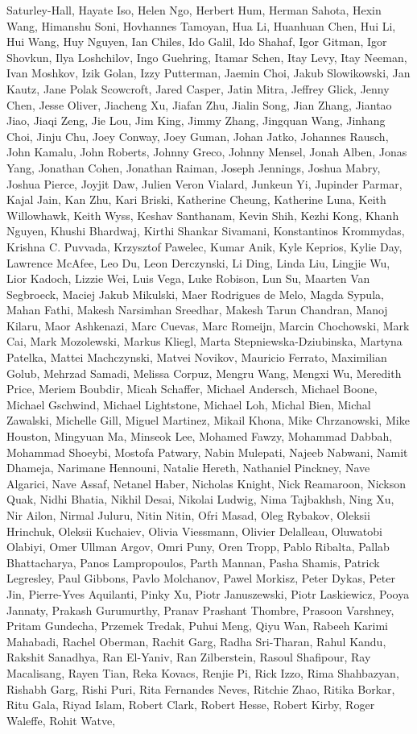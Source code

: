 Saturley-Hall, Hayate Iso, Helen Ngo, Herbert Hum, Herman Sahota, Hexin Wang, Himanshu Soni, Hovhannes Tamoyan, Hua Li, Huanhuan Chen, Hui Li, Hui Wang, Huy Nguyen, Ian Chiles, Ido Galil, Ido Shahaf, Igor Gitman, Igor Shovkun, Ilya Loshchilov, Ingo Guehring, Itamar Schen, Itay Levy, Itay Neeman, Ivan Moshkov, Izik Golan, Izzy Putterman, Jaemin Choi, Jakub Slowikowski, Jan Kautz, Jane Polak Scowcroft, Jared Casper, Jatin Mitra, Jeffrey Glick, Jenny Chen, Jesse Oliver, Jiacheng Xu, Jiafan Zhu, Jialin Song, Jian Zhang, Jiantao Jiao, Jiaqi Zeng, Jie Lou, Jim King, Jimmy Zhang, Jingquan Wang, Jinhang Choi, Jinju Chu, Joey Conway, Joey Guman, Johan Jatko, Johannes Rausch, John Kamalu, John Roberts, Johnny Greco, Johnny Mensel, Jonah Alben, Jonas Yang, Jonathan Cohen, Jonathan Raiman, Joseph Jennings, Joshua Mabry, Joshua Pierce, Joyjit Daw, Julien Veron Vialard, Junkeun Yi, Jupinder Parmar, Kajal Jain, Kan Zhu, Kari Briski, Katherine Cheung, Katherine Luna, Keith Willowhawk, Keith Wyss, Keshav Santhanam, Kevin Shih, Kezhi Kong, Khanh Nguyen, Khushi Bhardwaj, Kirthi Shankar Sivamani, Konstantinos Krommydas, Krishna C. Puvvada, Krzysztof Pawelec, Kumar Anik, Kyle Keprios, Kylie Day, Lawrence McAfee, Leo Du, Leon Derczynski, Li Ding, Linda Liu, Lingjie Wu, Lior Kadoch, Lizzie Wei, Luis Vega, Luke Robison, Lun Su, Maarten Van Segbroeck, Maciej Jakub Mikulski, Maer Rodrigues de Melo, Magda Sypula, Mahan Fathi, Makesh Narsimhan Sreedhar, Makesh Tarun Chandran, Manoj Kilaru, Maor Ashkenazi, Marc Cuevas, Marc Romeijn, Marcin Chochowski, Mark Cai, Mark Mozolewski, Markus Kliegl, Marta Stepniewska-Dziubinska, Martyna Patelka, Mattei Machczynski, Matvei Novikov, Mauricio Ferrato, Maximilian Golub, Mehrzad Samadi, Melissa Corpuz, Mengru Wang, Mengxi Wu, Meredith Price, Meriem Boubdir, Micah Schaffer, Michael Andersch, Michael Boone, Michael Gschwind, Michael Lightstone, Michael Loh, Michal Bien, Michal Zawalski, Michelle Gill, Miguel Martinez, Mikail Khona, Mike Chrzanowski, Mike Houston, Mingyuan Ma, Minseok Lee, Mohamed Fawzy, Mohammad Dabbah, Mohammad Shoeybi, Mostofa Patwary, Nabin Mulepati, Najeeb Nabwani, Namit Dhameja, Narimane Hennouni, Natalie Hereth, Nathaniel Pinckney, Nave Algarici, Nave Assaf, Netanel Haber, Nicholas Knight, Nick Reamaroon, Nickson Quak, Nidhi Bhatia, Nikhil Desai, Nikolai Ludwig, Nima Tajbakhsh, Ning Xu, Nir Ailon, Nirmal Juluru, Nitin Nitin, Ofri Masad, Oleg Rybakov, Oleksii Hrinchuk, Oleksii Kuchaiev, Olivia Viessmann, Olivier Delalleau, Oluwatobi Olabiyi, Omer Ullman Argov, Omri Puny, Oren Tropp, Pablo Ribalta, Pallab Bhattacharya, Panos Lampropoulos, Parth Mannan, Pasha Shamis, Patrick Legresley, Paul Gibbons, Pavlo Molchanov, Pawel Morkisz, Peter Dykas, Peter Jin, Pierre-Yves Aquilanti, Pinky Xu, Piotr Januszewski, Piotr Laskiewicz, Pooya Jannaty, Prakash Gurumurthy, Pranav Prashant Thombre, Prasoon Varshney, Pritam Gundecha, Przemek Tredak, Puhui Meng, Qiyu Wan, Rabeeh Karimi Mahabadi, Rachel Oberman, Rachit Garg, Radha Sri-Tharan, Rahul Kandu, Rakshit Sanadhya, Ran El-Yaniv, Ran Zilberstein, Rasoul Shafipour, Ray Macalisang, Rayen Tian, Reka Kovacs, Renjie Pi, Rick Izzo, Rima Shahbazyan, Rishabh Garg, Rishi Puri, Rita Fernandes Neves, Ritchie Zhao, Ritika Borkar, Ritu Gala, Riyad Islam, Robert Clark, Robert Hesse, Robert Kirby, Roger Waleffe, Rohit Watve, 